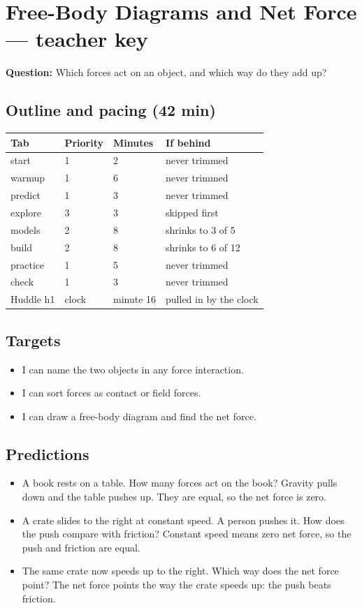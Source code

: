 \documentclass[11pt]{article}
\begin{document}
\section*{Free-Body Diagrams and Net Force --- teacher key}
\textbf{Question:} Which forces act on an object, and which way do they add up?\par
\subsection*{Outline and pacing (42 min)}\begin{tabular}{@{}llll@{}}\toprule Tab & Priority & Minutes & If behind\\\midrule
start & 1 & 2 & never trimmed\\
warmup & 1 & 6 & never trimmed\\
predict & 1 & 3 & never trimmed\\
explore & 3 & 3 & skipped first\\
models & 2 & 8 & shrinks to 3 of 5\\
build & 2 & 8 & shrinks to 6 of 12\\
practice & 1 & 5 & never trimmed\\
check & 1 & 3 & never trimmed\\
Huddle h1 & clock & minute 16 & pulled in by the clock\\
\bottomrule\end{tabular}
\subsection*{Targets}\begin{itemize}\item I can name the two objects in any force interaction.
\item I can sort forces as contact or field forces.
\item I can draw a free-body diagram and find the net force.\end{itemize}
\subsection*{Predictions}\begin{itemize}
\item A book rests on a table. How many forces act on the book?  Gravity pulls down and the table pushes up. They are equal, so the net force is zero.
\item A crate slides to the right at constant speed. A person pushes it. How does the push compare with friction?  Constant speed means zero net force, so the push and friction are equal.
\item The same crate now speeds up to the right. Which way does the net force point?  The net force points the way the crate speeds up: the push beats friction.
\end{itemize}
\end{document}

